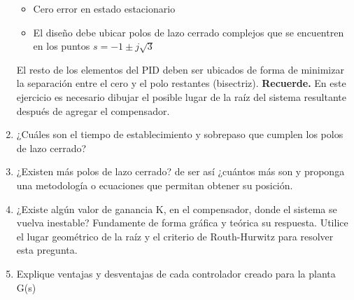 \documentclass[
  11pt,
  letterpaper,
   addpoints,
   answers
  ]{exam}
\begin{document}
\begin{questions}
\begin{enumerate}
\begin{itemize}
        \item Cero error en estado estacionario
        \item El diseño debe ubicar polos de lazo cerrado complejos que se encuentren en los puntos $s = -1 \pm j\sqrt{3}$
    \end{itemize}
    El resto de los elementos del PID deben ser ubicados de forma de minimizar la separación entre el cero y el polo restantes (bisectriz). \textbf{Recuerde.} En este ejercicio es necesario dibujar el posible lugar de la raíz del sistema resultante después de agregar el compensador.
        \item  ¿Cuáles son el tiempo de establecimiento y sobrepaso que cumplen los polos de lazo cerrado? 
        \item ¿Existen más polos de lazo cerrado? de ser así ¿cuántos más son y proponga una metodología o ecuaciones que permitan obtener su posición. 
        \item ¿Existe algún valor de ganancia K, en el compensador, donde el sistema se vuelva inestable? Fundamente de forma gráfica y teórica su respuesta. Utilice el lugar geométrico de la raíz y el criterio de Routh-Hurwitz para resolver esta pregunta. 
        \item Explique ventajas y desventajas de cada controlador creado para la planta G(s)
    \end{enumerate}

\begin{solution}

\end{solution}
\end{questions}
\end{document}
